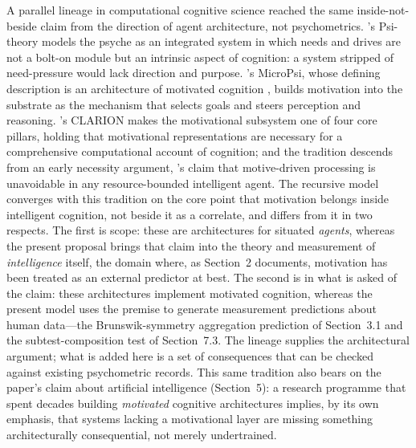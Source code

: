 \documentclass[12pt,a4paper]{article}
\begin{document}
A parallel lineage in computational cognitive science reached the same inside-not-beside claim from the direction of agent architecture, not psychometrics. \citeauthor{Dorner1999}'s Psi-theory \citep{Dorner1999,DornerGuss2013} models the psyche as an integrated system in which needs and drives are not a bolt-on module but an intrinsic aspect of cognition: a system stripped of need-pressure would lack direction and purpose. \citeauthor{Bach2009}'s MicroPsi, whose defining description is an architecture of motivated cognition \citep{Bach2009,Bach2015}, builds motivation into the substrate as the mechanism that selects goals and steers perception and reasoning. \citeauthor{Sun2009}'s CLARION \citep{Sun2009} makes the motivational subsystem one of four core pillars, holding that motivational representations are necessary for a comprehensive computational account of cognition; and the tradition descends from an early necessity argument, \citeauthor{SlomanCroucher1981}'s \citeyearpar{SlomanCroucher1981} claim that motive-driven processing is unavoidable in any resource-bounded intelligent agent. The recursive model converges with this tradition on the core point that motivation belongs inside intelligent cognition, not beside it as a correlate, and differs from it in two respects. The first is scope: these are architectures for situated \emph{agents}, whereas the present proposal brings that claim into the theory and measurement of \emph{intelligence} itself, the domain where, as Section~2 documents, motivation has been treated as an external predictor at best. The second is in what is asked of the claim: these architectures implement motivated cognition, whereas the present model uses the premise to generate measurement predictions about human data---\hspace{0pt}the Brunswik-symmetry aggregation prediction of Section~3.1 and the subtest-composition test of Section~7.3. The lineage supplies the architectural argument; what is added here is a set of consequences that can be checked against existing psychometric records. This same tradition also bears on the paper's claim about artificial intelligence (Section~5): a research programme that spent decades building \emph{motivated} cognitive architectures implies, by its own emphasis, that systems lacking a motivational layer are missing something architecturally consequential, not merely undertrained.
\end{document}
